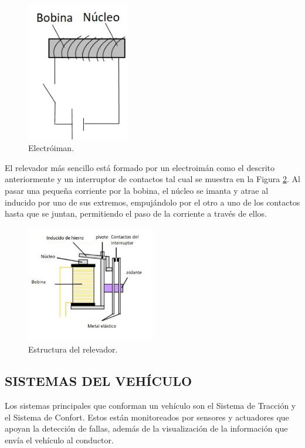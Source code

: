 %
\begin{figure}[H]
\centering
\includegraphics[width=0.4\textwidth]{marco/fig1.jpg}
\caption{Electróiman. }
\label{Muno}
\end{figure}
%

El relevador más sencillo está formado por un electroimán como el descrito anteriormente y un interruptor de contactos tal cual se muestra en la Figura \ref{Mdos}. Al pasar una pequeña corriente por la bobina, el núcleo se imanta y atrae al inducido por uno de sus extremos, empujándolo por el otro a uno de los contactos hasta que se juntan, permitiendo el paso de la corriente a través de ellos.

%
\begin{figure}[H]
\centering
\includegraphics[width=0.5\textwidth]{marco/fig2.jpg}
\caption{Estructura del relevador. }
\label{Mdos}
\end{figure}
%

\subsection{SISTEMAS DEL VEHÍCULO}
Los sistemas principales que conforman un vehículo son el Sistema de Tracción y el Sistema de Confort. Estos están monitoreados por sensores y actuadores que apoyan la detección de fallas, además de la visualización de la información que envía el vehículo al conductor.\\

